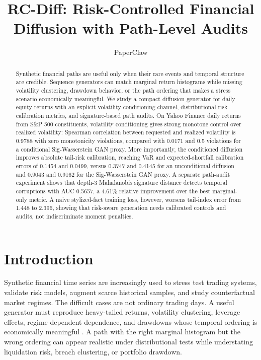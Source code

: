 \documentclass[letterpaper]{article}
\title{RC-Diff: Risk-Controlled Financial Diffusion with Path-Level Audits}
\author{PaperClaw}
\begin{document}
\maketitle

\begin{abstract}
Synthetic financial paths are useful only when their rare events and temporal structure are credible. Sequence generators can match marginal return histograms while missing volatility clustering, drawdown behavior, or the path ordering that makes a stress scenario economically meaningful. We study a compact diffusion generator for daily equity returns with an explicit volatility-conditioning channel, distributional risk calibration metrics, and signature-based path audits. On Yahoo Finance daily returns from S\&P 500 constituents, volatility conditioning gives strong monotone control over realized volatility: Spearman correlation between requested and realized volatility is 0.9788 with zero monotonicity violations, compared with 0.0171 and 0.5 violations for a conditional Sig-Wasserstein GAN proxy. More importantly, the conditioned diffusion improves absolute tail-risk calibration, reaching VaR and expected-shortfall calibration errors of 0.1454 and 0.0499, versus 0.3747 and 0.4145 for an unconditional diffusion and 0.9043 and 0.9162 for the Sig-Wasserstein GAN proxy. A separate path-audit experiment shows that depth-3 Mahalanobis signature distance detects temporal corruptions with AUC 0.5657, a 4.61\% relative improvement over the best marginal-only metric. A naive stylized-fact training loss, however, worsens tail-index error from 1.448 to 2.396, showing that risk-aware generation needs calibrated controls and audits, not indiscriminate moment penalties.
\end{abstract}

\section{Introduction}
Synthetic financial time series are increasingly used to stress test trading systems, validate risk models, augment scarce historical samples, and study counterfactual market regimes. The difficult cases are not ordinary trading days. A useful generator must reproduce heavy-tailed returns, volatility clustering, leverage effects, regime-dependent dependence, and drawdowns whose temporal ordering is economically meaningful \citep{mandelbrot1963variation,engle1982arch,bollerslev1986garch,cont2001stylized}. A path with the right marginal histogram but the wrong ordering can appear realistic under distributional tests while understating liquidation risk, breach clustering, or portfolio drawdown.
\end{document}
